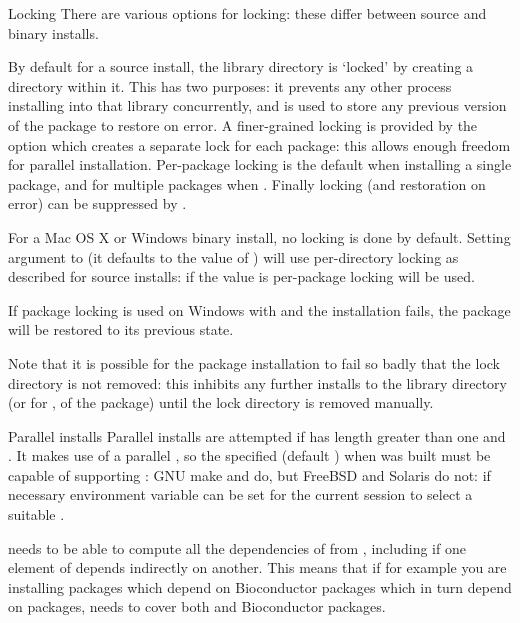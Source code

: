 \begin{Section}{Locking}
There are various options for locking: these differ between source and
binary installs.

By default for a source install, the library directory is
`locked' by creating a directory  within it.  This
has two purposes: it prevents any other process installing into that
library concurrently, and is used to store any previous version of the
package to restore on error.  A finer-grained locking is provided by
the option  which creates a separate lock for each
package: this allows enough freedom for parallel
installation.  Per-package locking is the default when installing a
single package, and for multiple packages when .
Finally locking (and restoration on error) can be suppressed by
.


For a Mac OS X or Windows binary install, no locking is done by
default.  Setting argument  to  (it defaults to
the value of ) will use
per-directory locking as described for source installs: if the value
is  per-package locking will be used.

If package locking is used on Windows with  and
the installation fails, the package will be restored to its previous
state.

Note that it is possible for the package installation to fail so badly
that the lock directory is not removed: this inhibits any further
installs to the library directory (or for , of the
package) until the lock directory is removed manually.
\end{Section}
%
\begin{Section}{Parallel installs}
Parallel installs are attempted if  has length greater than
one and .  It makes use of a parallel ,
so the  specified (default ) when \R{} was
built must be capable of supporting : GNU make
and  do, but FreeBSD and Solaris  do not:
if necessary environment variable  can be set for the
current session to select a suitable .

 needs to be able to compute all the
dependencies of  from , including if one
element of  depends indirectly on another.  This means that
if for example you are installing  packages which depend
on Bioconductor packages which in turn depend on 
packages,  needs to cover both  and
Bioconductor packages.
\end{Section}
